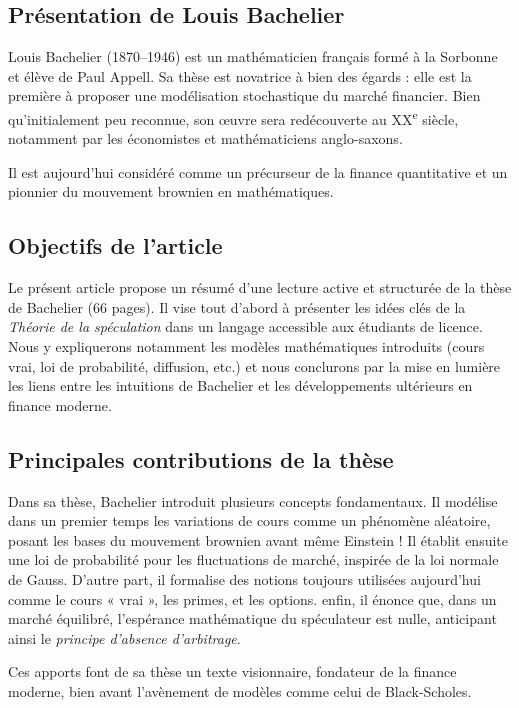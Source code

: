 \documentclass[12pt,a4paper]{article}
\begin{document}
\subsection{Présentation de Louis Bachelier}

Louis Bachelier (1870–1946) est un mathématicien français formé à la Sorbonne et élève de Paul Appell. Sa thèse est novatrice à bien des égards : elle est la première à proposer une modélisation stochastique du marché financier. Bien qu’initialement peu reconnue, son œuvre sera redécouverte au XX\textsuperscript{e} siècle, notamment par les économistes et mathématiciens anglo-saxons.

Il est aujourd’hui considéré comme un précurseur de la finance quantitative et un pionnier du mouvement brownien en mathématiques.

\subsection{Objectifs de l'article}

Le présent article propose un résumé d'une lecture active et structurée de la thèse de Bachelier (66 pages). Il vise tout d'abord à présenter les idées clés de la \textit{Théorie de la spéculation} dans un langage accessible aux étudiants de licence. Nous y expliquerons notamment les modèles mathématiques introduits (cours vrai, loi de probabilité, diffusion, etc.) et nous conclurons par la mise en lumière les liens entre les intuitions de Bachelier et les développements ultérieurs en finance moderne.

\subsection{Principales contributions de la thèse}

Dans sa thèse, Bachelier introduit plusieurs concepts fondamentaux. Il modélise dans un premier temps les variations de cours comme un phénomène aléatoire, posant les bases du mouvement brownien avant même Einstein ! Il établit ensuite une loi de probabilité pour les fluctuations de marché, inspirée de la loi normale de Gauss. D'autre part, il formalise des notions toujours utilisées aujourd’hui comme le cours « vrai », les primes, et les options. enfin, il énonce que, dans un marché équilibré, l’espérance mathématique du spéculateur est nulle, anticipant ainsi le \textit{principe d’absence d’arbitrage}.

Ces apports font de sa thèse un texte visionnaire, fondateur de la finance moderne, bien avant l’avènement de modèles comme celui de Black-Scholes.
\end{document}
